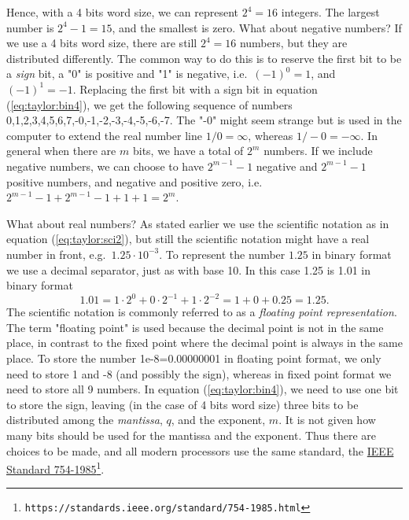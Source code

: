 \documentclass[graybox,sectrefs,envcountresetchap,open=right,final]{svmonodo}
\begin{document}
Hence, with a 4 bits word size, we can represent $2^4=16$ integers. The largest number is $2^4-1=15$, and the smallest is zero. What about negative numbers? If we use a 4 bits word size, there are still $2^4=16$ numbers, but they are distributed differently. The common way to do this is to reserve the first bit to be a \emph{sign} bit, a "0" is positive and "1" is negative, i.e.~$(-1)^0 = 1$, and $(-1)^1=-1$. Replacing the first bit with a sign bit in equation (\ref{eq:taylor:bin4}), we get the following sequence of numbers 0,1,2,3,4,5,6,7,-0,-1,-2,-3,-4,-5,-6,-7. The "-0" might seem strange but is used in the computer to extend the real number line $1/0=\infty$, whereas $1/-0=-\infty$. In general when there are $m$ bits, we have a total of $2^m$ numbers. If we include negative numbers, we can choose to have $2^{m-1}-1$ negative and $2^{m-1}-1$ positive numbers, and negative and positive zero, i.e.~$2^{m-1}-1+2^{m-1}-1+1+1=2^m$.

What about real numbers? As stated earlier we use the scientific notation as in equation (\ref{eq:taylor:sci2}), but still the scientific notation might have a real number in front, e.g.~$1.25\cdot 10^{-3}$. To represent the number $1.25$ in binary format we use a decimal separator, just as with base 10. In this case 1.25 is 1.01 in binary format
\begin{equation}
1.01=1\cdot 2^0 + 0\cdot 2^{-1}+1\cdot 2^{-2}=1 + 0 + 0.25=1.25.
\label{eq:taylor:b2fr}
\end{equation}
The scientific notation is commonly referred to as a \emph{floating point representation}. The term "floating point" is used because the decimal point is not in the same place, in contrast to the fixed point where the decimal point is always in the same place. To store the number 1e-8=0.00000001 in floating point format, we only need to store 1 and -8 (and possibly the sign), whereas in fixed point format we need to store all 9 numbers.  In equation (\ref{eq:taylor:bin4}), we need to use one bit to store the sign, leaving (in the case of 4 bits word size) three bits to be distributed among the \emph{mantissa}, $q$, and the exponent, $m$. It is not given how many bits should be used for the mantissa and the exponent. Thus there are choices to be made, and all modern processors use the same standard, the \href{{https://standards.ieee.org/standard/754-1985.html}}{IEEE Standard 754-1985}\footnote{\texttt{https://standards.ieee.org/standard/754-1985.html}}. 

\end{document}
